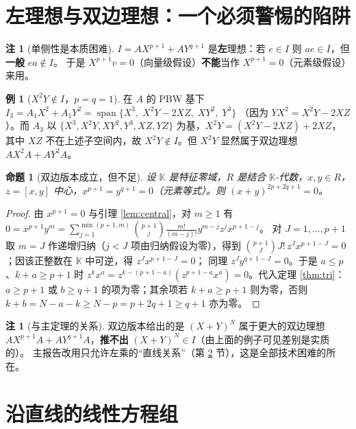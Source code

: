 \documentclass[11pt,UTF8]{ctexart}
\newtheorem{proposition}[theorem]{命题}
\theoremstyle{definition}
\newtheorem{remark}[theorem]{注}
\newtheorem{example}[theorem]{例}
\newcommand{\K}{\mathbb{K}}
\begin{document}
\section{左理想与双边理想：一个必须警惕的陷阱}\label{sec:onesided}

\begin{remark}[单侧性是本质困难]
$I=AX^{p+1}+AY^{q+1}$ 是\textbf{左}理想：若 $e\in I$ 则 $ae\in I$，但\textbf{一般} $ea\notin I$。
于是 $X^{p+1}v=0$（向量级假设）\textbf{不能}当作 $X^{p+1}=0$（元素级假设）来用。
\end{remark}

\begin{example}[$X^{2}Y\notin I$，$p=q=1$]
在 $A$ 的 PBW 基下
$I_3=A_1X^{2}+A_1Y^{2}=\operatorname{span}\{X^{3},\;X^{2}Y-2XZ,\;XY^{2},\;Y^{3}\}$
（因为 $YX^{2}=X^{2}Y-2XZ$）。而 $A_3$ 以
$\{X^{3},X^{2}Y,XY^{2},Y^{3},XZ,YZ\}$ 为基，$X^{2}Y=(X^{2}Y-2XZ)+2XZ$，
其中 $XZ$ 不在上述子空间内，故 $X^{2}Y\notin I$。但 $X^{2}Y$ 显然属于双边理想
$AX^{2}A+AY^{2}A$。
\end{example}

\begin{proposition}[双边版本成立，但不足]
设 $\K$ 是特征零域，$R$ 是结合 $\K$-代数，$x,y\in R$，$z=[x,y]$ 中心，$x^{p+1}=y^{q+1}=0$（元素等式）。则
$(x+y)^{2p+2q+1}=0$。
\end{proposition}

\begin{proof}
由 $x^{p+1}=0$ 与引理 \ref{lem:central}，对 $m\ge1$ 有
$0=x^{p+1}y^{m}=\sum_{j=1}^{\min(p+1,m)}\binom{p+1}{j}\frac{m!}{(m-j)!}y^{m-j}z^{j}x^{p+1-j}$。
对 $J=1,\dots,p+1$ 取 $m=J$ 作递增归纳（$j<J$ 项由归纳假设为零），得到 $\binom{p+1}{J}J!\,z^{J}x^{p+1-J}=0$；因该正整数在 $\K$ 中可逆，得 $z^{J}x^{p+1-J}=0$；
同理 $z^{J}y^{q+1-J}=0$。于是 $a\le p$、$k+a\ge p+1$ 时
$z^{k}x^{a}=z^{k-(p+1-a)}(z^{p+1-a}x^{a})=0$。代入定理 \ref{thm:tri}：$a\ge p+1$ 或 $b\ge q+1$
的项为零；其余项若 $k+a\ge p+1$ 则为零，否则 $k+b=N-a-k\ge N-p=p+2q+1\ge q+1$ 亦为零。
\end{proof}

\begin{remark}[与主定理的关系]
双边版本给出的是 $(X+Y)^{N}$ 属于更大的双边理想
$AX^{p+1}A+AY^{q+1}A$，\textbf{推不出} $(X+Y)^{N}\in I$（由上面的例子可见差别是实质的）。
主报告改用只允许左乘的“直线关系”（第 \ref{sec:line} 节），这是全部技术困难的所在。
\end{remark}

\section{沿直线的线性方程组}\label{sec:line}
\end{document}
